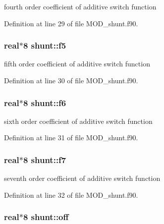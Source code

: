 fourth order coefficient of additive switch function 



Definition at line 29 of file M\-O\-D\-\_\-shunt.\-f90.

\hypertarget{classshunt_af7dd5be34822309bd4c84b1bc7a85a41}{
\subsubsection[{f5}]{\setlength{\rightskip}{0pt plus 5cm}real$\ast$8 shunt\-::f5}}\label{classshunt_af7dd5be34822309bd4c84b1bc7a85a41}


fifth order coefficient of additive switch function 



Definition at line 30 of file M\-O\-D\-\_\-shunt.\-f90.

\hypertarget{classshunt_aba5200d09f67d4c9eb4c7eb6e79d9cb2}{
\subsubsection[{f6}]{\setlength{\rightskip}{0pt plus 5cm}real$\ast$8 shunt\-::f6}}\label{classshunt_aba5200d09f67d4c9eb4c7eb6e79d9cb2}


sixth order coefficient of additive switch function 



Definition at line 31 of file M\-O\-D\-\_\-shunt.\-f90.

\hypertarget{classshunt_a4f12a67da810f34db385d9e119e42322}{
\subsubsection[{f7}]{\setlength{\rightskip}{0pt plus 5cm}real$\ast$8 shunt\-::f7}}\label{classshunt_a4f12a67da810f34db385d9e119e42322}


seventh order coefficient of additive switch function 



Definition at line 32 of file M\-O\-D\-\_\-shunt.\-f90.

\hypertarget{classshunt_a2dbeaa3a17c69426a549bb3e98c51df9}{
\subsubsection[{off}]{\setlength{\rightskip}{0pt plus 5cm}real$\ast$8 shunt\-::off}}\label{classshunt_a2dbeaa3a17c69426a549bb3e98c51df9}


